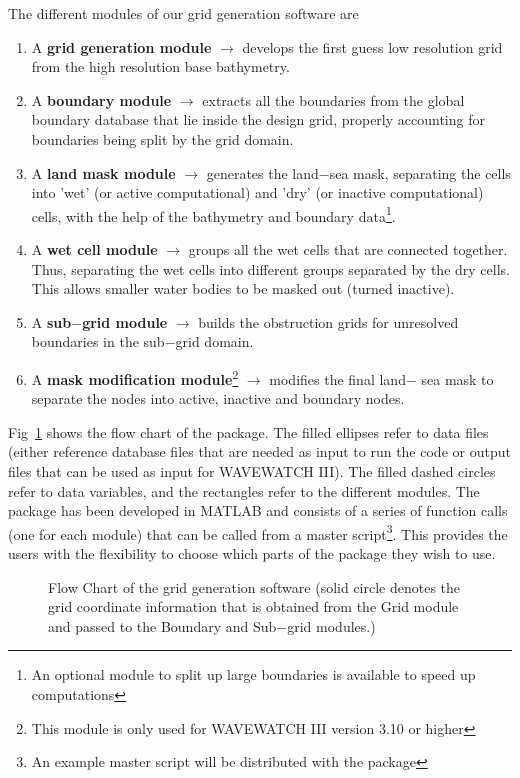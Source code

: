 \documentclass[12pt]{article}
\newcounter{myfigno}[section]
\newenvironment{myfig}[1]{\begin{figure}[#1]
                        \refstepcounter{myfigno}}
                       {\end{figure}}
\newcommand{\myfcap}[1]{\begin{list}{\ff Fig. \themyfigno\ :~\hfill}
                      {\rightmargin 8mm \labelsep 0mm
                       \labelwidth 8mm \leftmargin 8mm
                       \topsep 0mm \parskip 0mm \partopsep 0mm }
                       \item \ff #1 \end{list}}
\renewcommand{\themyfigno}{\thesection.\arabic{myfigno}}
\begin{document}
The different modules of our grid generation software are
\begin{enumerate}
\item A {\bf grid generation module} $\rightarrow$ develops the first guess low resolution grid from the high resolution base bathymetry.
\item A {\bf boundary module} $\rightarrow$ extracts all the boundaries from the global boundary database that lie inside the design grid, properly accounting for boundaries being split by the grid domain.
\item A {\bf land mask module} $\rightarrow$ generates the land$-$sea mask, separating the cells into 'wet' (or active computational) and 'dry' (or inactive computational) cells, with the help of the bathymetry and boundary data\footnote{An optional module to split up large boundaries is available to speed up computations}.
\item A {\bf wet cell  module} $\rightarrow$  groups all the wet cells that are connected together. Thus, separating the wet cells into different groups separated by the dry cells. This allows smaller water bodies to be masked out (turned inactive).
\item A {\bf sub$-$grid module} $\rightarrow$ builds the obstruction grids for unresolved boundaries in the sub$-$grid domain. 
\item A {\bf mask modification module}\footnote{This module is only used for WAVEWATCH III version 3.10 or higher} $\rightarrow$ modifies the final land$-$ sea mask to separate the nodes into active, inactive and boundary nodes. 
\end{enumerate}

Fig~\ref{fig:flow_chart} shows the flow chart of the package. The filled ellipses refer to data files (either reference database files that are needed as input to run the code or output files that can be used as input for WAVEWATCH III). The filled dashed circles refer to data variables, and the rectangles refer to the different modules. The package has been developed in MATLAB and consists of a series of function calls (one for each module) that can be called from a master script\footnote{An example master script will be distributed with the package}. This provides the users with the flexibility to choose which parts of the package they wish to use.  

\begin{myfig}{tbp}
\centerline{}
\myfcap{Flow Chart of the grid generation software (solid circle denotes the grid coordinate information that is obtained from the Grid module and passed to the Boundary and Sub$-$grid modules.)}
\label{fig:flow_chart}
\end{myfig}
\end{document}
